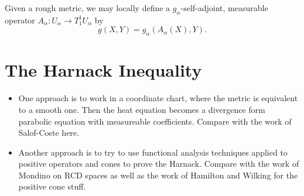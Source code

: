 \documentclass{amsart}
\begin{document}
Given a rough metric, we may locally define a \(g_{\alpha}\)-self-adjoint, measurable operator \(A_{\alpha} : U_{\alpha} \to T^1_1 U_{\alpha}\) by
\[
g(X, Y) = g_{\alpha} (A_{\alpha} (X), Y).
\]

\section{The Harnack Inequality}
\label{sec:harnack}

\begin{itemize}
\item One approach is to work in a coordinate chart, where the metric is equivalent to a smooth one. Then the heat equation becomes a divergence form parabolic equation with measureable coefficients. Compare with the work of Salof-Coste here.
\item Another approach is to try to use functional analysis techniques applied to positive operators and cones to prove the Harnack. Compare with the work of Mondino on RCD spaces as well as the work of Hamilton and Wilking for the positive cone stuff.
\end{itemize}
\end{document}
